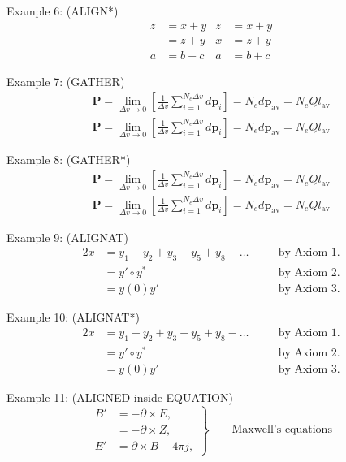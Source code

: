 \documentclass{book}
\begin{document}
\noindent Example 6: (ALIGN*)
\begin{align*}
z &= x+y &z &= x+y \\
  &= z+y &x &= z+y \\
a &= b+c &a &= b+c 
\end{align*}

\noindent Example 7: (GATHER)
\begin{gather}
\mathbf{P} = \lim_{\Delta v\to 0} \left[\frac{1}{\Delta v}\sum_{i=1}^{N_{e}\Delta v}d\mathbf{p}_{i}\right] = N_{e}d\mathbf{p}_{\mathrm{av}} = N_{e}Q{l}_{\mathrm{av}} \nonumber \\
\mathbf{P} = \lim_{\Delta v\to 0} \left[\frac{1}{\Delta v}\sum_{i=1}^{N_{e}\Delta v}d\mathbf{p}_{i}\right] = N_{e}d\mathbf{p}_{\mathrm{av}} = N_{e}Q{l}_{\mathrm{av}} 
\end{gather}

\noindent Example 8: (GATHER*)
\begin{gather*}
\mathbf{P} = \lim_{\Delta v\to 0} \left[\frac{1}{\Delta v}\sum_{i=1}^{N_{e}\Delta v}d\mathbf{p}_{i}\right] = N_{e}d\mathbf{p}_{\mathrm{av}} = N_{e}Q{l}_{\mathrm{av}} \nonumber \\
\mathbf{P} = \lim_{\Delta v\to 0} \left[\frac{1}{\Delta v}\sum_{i=1}^{N_{e}\Delta v}d\mathbf{p}_{i}\right] = N_{e}d\mathbf{p}_{\mathrm{av}} = N_{e}Q{l}_{\mathrm{av}} 
\end{gather*}


\noindent Example 9: (ALIGNAT)
\begin{alignat}{2}
x &= y_1 - y_2 + y_3 - y_5 + y_8 - \dots  &\quad &\text{by Axiom 1.} \nonumber \\
  &= y' \circ y^{*} &\quad &\text{by Axiom 2.} \nonumber\\ 
  &= y(0) y' &\quad &\text{by Axiom 3.} 
\end{alignat}

\noindent Example 10: (ALIGNAT*)
\begin{alignat*}{2}
x &= y_1 - y_2 + y_3 - y_5 + y_8 - \dots  &\quad &\text{by Axiom 1.} \\
  &= y' \circ y^{*} & &\text{by Axiom 2.} \\ 
  &= y(0) y' & &\text{by Axiom 3.} 
\end{alignat*}

\noindent Example 11: (ALIGNED inside EQUATION)
\begin{equation}
\left.\begin{aligned}
B' &= -\partial\times E,\\
   &= -\partial\times Z,\\
E' &= \partial\times B - 4\pi j,
\end{aligned}\right\} \qquad \text{Maxwell's equations} 
\end{equation}
\end{document}
